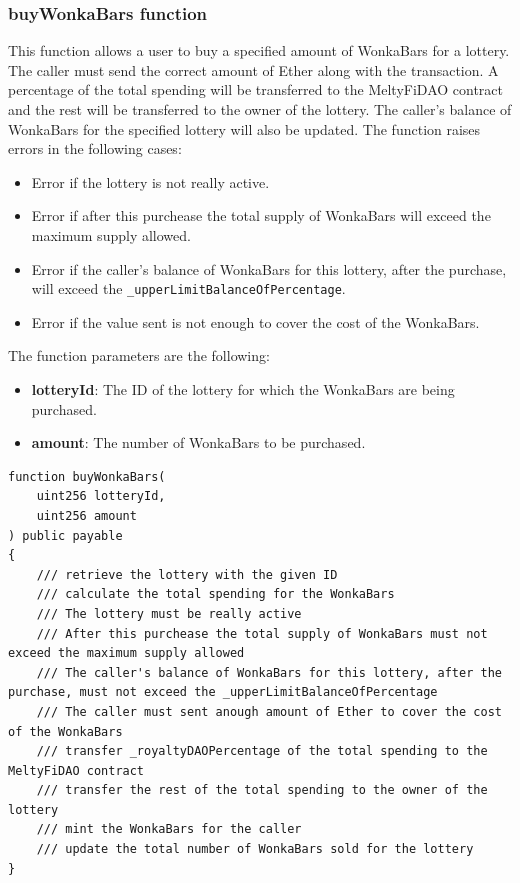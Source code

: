 \subsubsection{buyWonkaBars function}
This function allows a user to buy a specified amount of WonkaBars for a lottery. The caller must send the correct amount of Ether along with the transaction. A percentage of the total spending will be transferred to the MeltyFiDAO contract and the rest will be transferred to the owner of the lottery. The caller's balance of WonkaBars for the specified lottery will also be updated. The function raises errors in the following cases:
\begin{itemize}
    \item Error if the lottery is not really active.
    \item Error if after this purchease the total supply of WonkaBars will exceed the maximum supply allowed.
    \item Error if the caller's balance of WonkaBars for this lottery, after the purchase, will exceed the \texttt{\_upperLimitBalanceOfPercentage}.
    \item Error if the value sent is not enough to cover the cost of the WonkaBars.
\end{itemize}
The function parameters are the following:
\begin{itemize}
    \item \textbf{lotteryId}: The ID of the lottery for which the WonkaBars are being purchased.
    \item \textbf{amount}: The number of WonkaBars to be purchased.
\end{itemize}
\begin{verbatim}
function buyWonkaBars(
    uint256 lotteryId, 
    uint256 amount
) public payable
{
    /// retrieve the lottery with the given ID
    /// calculate the total spending for the WonkaBars
    /// The lottery must be really active
    /// After this purchease the total supply of WonkaBars must not exceed the maximum supply allowed
    /// The caller's balance of WonkaBars for this lottery, after the purchase, must not exceed the _upperLimitBalanceOfPercentage
    /// The caller must sent anough amount of Ether to cover the cost of the WonkaBars
    /// transfer _royaltyDAOPercentage of the total spending to the MeltyFiDAO contract
    /// transfer the rest of the total spending to the owner of the lottery
    /// mint the WonkaBars for the caller
    /// update the total number of WonkaBars sold for the lottery
}
\end{verbatim}
